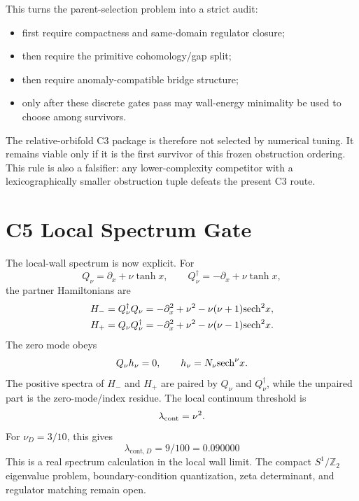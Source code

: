 \documentclass[11pt]{article}
\begin{document}
This turns the parent-selection problem into a strict audit:
\begin{itemize}
\item first require compactness and same-domain regulator closure;
\item then require the primitive cohomology/gap split;
\item then require anomaly-compatible bridge structure;
\item only after these discrete gates pass may wall-energy minimality be used
to choose among survivors.
\end{itemize}
The relative-orbifold C3 package is therefore not selected by numerical tuning.
It remains viable only if it is the first survivor of this frozen obstruction
ordering.  This rule is also a falsifier: any lower-complexity competitor with a
lexicographically smaller obstruction tuple defeats the present C3 route.

\section{C5 Local Spectrum Gate}
The local-wall spectrum is now explicit.  For
\begin{equation}
Q_\nu=\partial_x+\nu\tanh x,
\qquad
Q_\nu^\dagger=-\partial_x+\nu\tanh x,
\end{equation}
the partner Hamiltonians are
\begin{align}
H_-&=Q_\nu^\dagger Q_\nu
=-\partial_x^2+\nu^2-\nu(\nu+1){\rm sech}^2x,\\
H_+&=Q_\nu Q_\nu^\dagger
=-\partial_x^2+\nu^2-\nu(\nu-1){\rm sech}^2x.
\end{align}
The zero mode obeys
\begin{equation}
Q_\nu h_\nu=0,\qquad h_\nu=N_\nu{\rm sech}^\nu x.
\end{equation}
The positive spectra of $H_-$ and $H_+$ are paired by $Q_\nu$ and
$Q_\nu^\dagger$, while the unpaired part is the zero-mode/index residue.  The
local continuum threshold is
\begin{equation}
\lambda_{\rm cont}=\nu^2.
\end{equation}
For $\nu_D=3/10$, this gives
\begin{equation}
\lambda_{\mathrm{cont},D}=9/100=0.090000
\end{equation}
This is a real spectrum calculation in the local wall limit.  The compact
$S^1/\mathbb Z_2$ eigenvalue problem, boundary-condition quantization, zeta
determinant, and regulator matching remain open.
\end{document}
